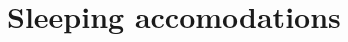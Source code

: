\documentclass[../../../main.tex]{subfiles}
\begin{document}
\section{Sleeping accomodations}
\end{document}
